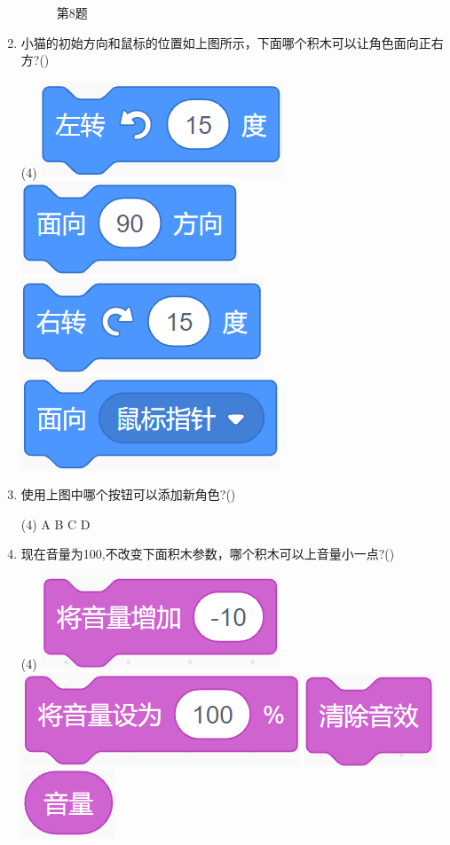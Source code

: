 \documentclass[10pt, a4paper]{article}
\begin{document}
\begin{enumerate}
\begin{figure}[htbp]
\begin{minipage}[t]{.38\textwidth}
\begin{minipage}[t]{.48\textwidth}
                \end{minipage}
                \caption*{第8题}
            \end{minipage}
        \end{figure}

        \item 小猫的初始方向和鼠标的位置如上图所示，下面哪个积木可以让角色面向正右方?(\qquad)
        \begin{tasks}(4)
            \task \includegraphics[width=.12\textwidth]{5a.png}
            \task \includegraphics[width=.12\textwidth]{5b.png}
            \task \includegraphics[width=.12\textwidth]{5c.png}
            \task \includegraphics[width=.12\textwidth]{5d.png}
        \end{tasks}

        \item 使用上图中哪个按钮可以添加新角色?(\qquad)
        \begin{tasks}(4)
            \task A
            \task B
            \task C
            \task D
        \end{tasks}

        \item 现在音量为100,不改变下面积木参数，哪个积木可以上音量小一点?(\qquad)
        \begin{tasks}(4)
            \task \includegraphics[width=.13\textwidth]{7a.png}
            \task \includegraphics[width=.15\textwidth]{7b.png}
            \task \includegraphics[width=.08\textwidth]{7c.png}
            \task \includegraphics[width=.07\textwidth]{7d.png}
        \end{tasks}
           

\end{enumerate}
\end{document}
